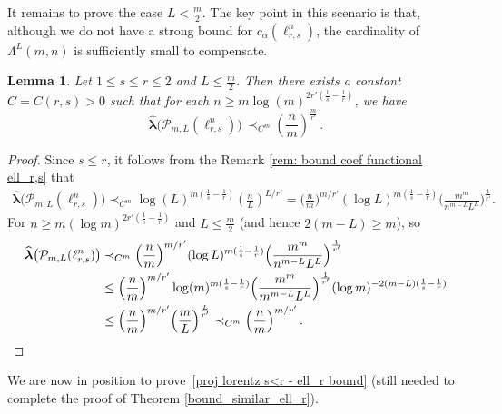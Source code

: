 \documentclass[12pt]{amsart}
\numberwithin{subsection}{section}
\newtheorem{lemma}[theorem]{Lemma}
\theoremstyle{definition}
\theoremstyle{remark}
\begin{document}
It remains to prove the case $L < \frac{m}{2}$. The key point in this scenario is that, although we do not have a strong bound for
$c_\alpha(\ell_{r,s}^n)$, the cardinality of $\Lambda^L(m,n)$ is sufficiently small to compensate.


\begin{lemma}\label{lemma L>m/2}
Let $1 \leq s \leq r \leq 2$ and  $L\le \frac{m}{2}$. Then there exists a constant $C=C(r,s)>0$ such that for  each $n \geq m \log(m)^{2r'(\frac{1}{s}-\frac{1}{r})}$, we have
\begin{equation*} \label{good bound for L>m/2}
\widehat{\boldsymbol{\lambda}}\big(\mathcal P_{m,L}(\ell_{r,s}^n)\big)
 \,\prec_{C^m} \left(\frac{n}{m} \right)^{\frac{m}{r'}}\,.
\end{equation*}
\end{lemma}


\begin{proof}
Since $s \le r$, it follows from the Remark \ref{rem: bound coef functional ell_r,s} that
\begin{align*}
\widehat{\boldsymbol{\lambda}}\big(\mathcal P_{m,L}(\ell_{r,s}^n)\big)
\prec_{C^m}  \log(L)^{m(\frac1{s}-\frac1{r})}  \left( \frac{n}{L} \right)^{L/r'} \label{bound depending on L for L>m/2} = \Big(\frac{n}{m}\Big)^{m/r'}(\log L)^{m(\frac1{s}-\frac1{r})}\Big(\frac{m^m}{n^{m-L}L^L}\Big)^{\frac{1}{r'}}.\nonumber
\end{align*}
For $n \geq m (\log m)^{2r'(\frac{1}{s}-\frac{1}{r})}$ and  $L\le \frac{m}{2}$ (and hence $2(m-L)\ge m$), so
\begin{align*}
\widehat{\boldsymbol{\lambda}}\big(\mathcal P_{m,L}(\ell_{r,s}^n)\big)
& \prec_{C^m} \Big(\frac{n}{m}\Big)^{m/r'}(\log L)^{m(\frac1{s}-\frac1{r})}\Big(\frac{m^m}{n^{m-L}L^L}\Big)^{\frac{1}{r'}}\\
&
\le \Big(\frac{n}{m}\Big)^{m/r'}\log(m)^{m(\frac1{s}-\frac1{r})}\Big(\frac{m^m}{m^{m-L}L^L}\Big)^{\frac{1}{r'}}(\log m)^{-2(m-L)(\frac1{s}-\frac1{r})}\\
&
\le \Big(\frac{n}{m}\Big)^{m/r'}\Big(\frac{m}{L}\Big)^{\frac{L}{r'}}\prec_{C^m} \Big(\frac{n}{m}\Big)^{m/r'}\,. \qedhere
\end{align*}
\end{proof}


We  are now in position to prove~\eqref{proj lorentz s<r - ell_r bound} (still needed to complete the proof of Theorem
\ref{bound_similar_ell_r}).
\end{document}
